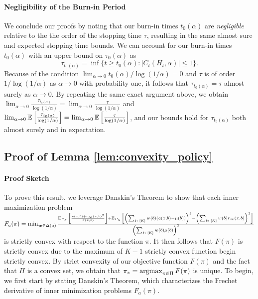 \documentclass{article}
\begin{document}
\begin{appendices}
\paragraph{Negligibility of the Burn-in Period} We conclude our proofs by noting that our burn-in times $t_0(\alpha)$ are \textit{negligible} relative to the the order of the stopping time $\tau$, resulting in the same almost sure and expected stopping time bounds. We can account for our burn-in times $t_0(\alpha)$ with an upper bound on $\tau_0(\alpha)$ as 
\begin{equation}
    \tau_{t_0(\alpha)} = \inf\{t \geq t_0(\alpha): |C_t(H_t, \alpha)| \leq 1\}.
\end{equation}
Because of the condition $\lim_{\alpha \rightarrow 0}t_0(\alpha)/\log(1/\alpha) = 0$ and $\tau$ is of order $1/\log(1/\alpha)$ as $\alpha \rightarrow 0$ with probability one, it follows that $\tau_{t_0(\alpha)} = \tau$ almost surely as $\alpha \rightarrow 0$. By repeating the same exact argument above, we obtain $\lim_{\alpha \rightarrow 0}\frac{\tau_{t_0(\alpha)}}{\log(1/\alpha)} = \lim_{\alpha \rightarrow 0}\frac{\tau}{\log(1/\alpha)}$ and $\lim_{\alpha \rightarrow 0}\mathbb{E}\left[\frac{\tau_{t_0(\alpha)}}{\log(1/\alpha)}\right] = \lim_{\alpha \rightarrow 0}\mathbb{E}\left[\frac{\tau}{\log(1/\alpha)}\right]$, and our bounds hold for $\tau_{t_0(\alpha)}$ both almost surely and in expectation.


\newpage
\subsection{Proof of Lemma \ref{lem:convexity_policy}}

\paragraph{Proof Sketch} To prove this result, we leverage Danskin's Theorem to show that each inner maximization problem $F_a(\pi) = \min_{\boldsymbol{w} \in \Delta(a)}\frac{ \mathbb{E}_{P_X}\left[\frac{v(x,b) + r_\infty(x,b)^2}{\pi(x,b)}\right]+ \mathbb{E}_{P_X}\left[ \left(\sum_{b \in [K]} w(b) (g(x,b)- \mu(b)) \right)^2 - \left(\sum_{b \in [K]} w(b) r_\infty(x,b) \right)^2 \right] }{\left(\sum_{b \in [K]} w(b)  \mu(b) \right)^2}$ is strictly convex with respect to the function $\pi$. It then follows that $F(\pi)$ is strictly convex due to the maximum of $K-1$ strictly convex function begin strictly convex. By strict convexity of our objective function $F(\pi)$ and the fact that $\Pi$ is a convex set, we obtain that $\pi_* = \argmax_{\pi \in \Pi}F(\pi)$ is unique. To begin, we first start by stating Danskin's Theorem, which characterizes  the Frechet derivative of inner minimization problems $F_a(\pi)$. 


\end{appendices}
\end{document}
